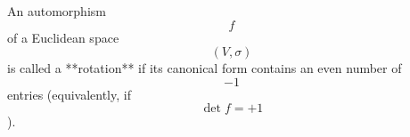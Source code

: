 An automorphism $$f$$ of a Euclidean space $$(V, \sigma)$$ is called a **rotation** if its canonical form contains an even number of $$-1$$ entries (equivalently, if $$\det f = +1$$).
